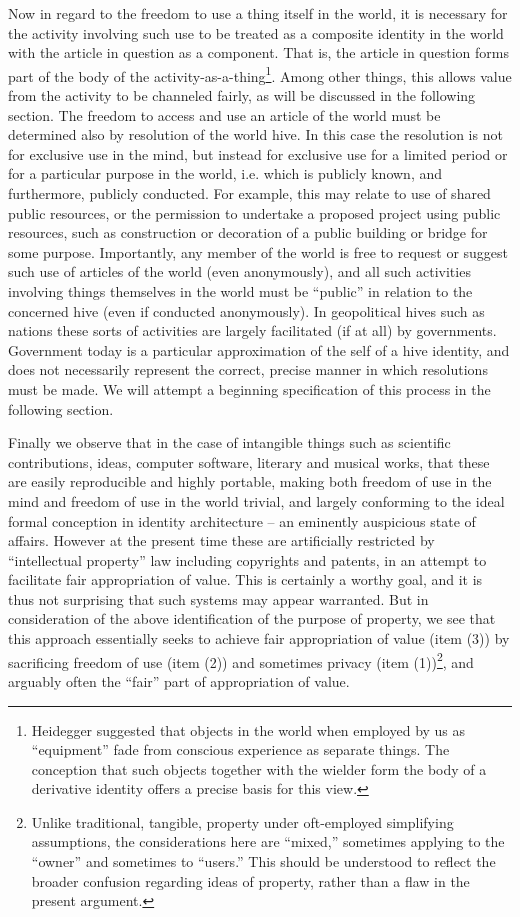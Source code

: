 \documentclass[pra,twocolumn,groupedaddress,10pt]{revtex4}
\theoremstyle{definition}
\begin{document}
Now in regard to the freedom to use a thing itself in the world, it is necessary for the activity involving such use to be treated as a composite identity in the world with the article in question as a component. That is, the article in question forms part of the body of the activity-as-a-thing\footnote{Heidegger\cite{heidegger} suggested that objects in the world when employed by us as ``equipment'' fade from conscious experience as separate things. The conception that such objects together with the wielder form the body of a derivative identity offers a precise basis for this view.}. Among other things, this allows value from the activity to be channeled fairly, as will be discussed in the following section. The freedom to access and use an article of the world must be determined also by resolution of the world hive. In this case the resolution is not for exclusive use in the mind, but instead for exclusive use for a limited period or for a particular purpose in the world, i.e. which is publicly known, and furthermore, publicly conducted. For example, this may relate to use of shared public resources, or the permission to undertake a proposed project using public resources, such as construction or decoration of a public building or bridge for some purpose. Importantly, any member of the world is free to request or suggest such use of articles of the world (even anonymously), and all such activities involving things themselves in the world must be ``public'' in relation to the concerned hive (even if conducted anonymously). In geopolitical hives such as nations these sorts of activities are largely facilitated (if at all) by governments. Government today is a particular approximation of the self of a hive identity, and does not necessarily represent the correct, precise manner in which resolutions must be made. We will attempt a beginning specification of this process in the following section.

Finally we observe that in the case of intangible things such as scientific contributions, ideas, computer software, literary and musical works, that these are easily reproducible and highly portable, making both freedom of use in the mind and freedom of use in the world trivial, and largely conforming to the ideal formal conception in identity architecture -- an eminently auspicious state of affairs. However at the present time these are artificially restricted by ``intellectual property'' law including copyrights and patents, in an attempt to facilitate fair appropriation of value. This is certainly a worthy goal, and it is thus not surprising that such systems may appear warranted. But in consideration of the above identification of the purpose of property, we see that this approach essentially seeks to achieve fair appropriation of value (item (3)) by sacrificing freedom of use (item (2)) and sometimes privacy (item (1))\footnote{Unlike traditional, tangible, property under oft-employed simplifying assumptions, the considerations here are ``mixed,'' sometimes applying to the ``owner'' and sometimes to ``users.'' This should be understood to reflect the broader confusion regarding ideas of property, rather than a flaw in the present argument.}, and arguably often the ``fair'' part of appropriation of value.
\end{document}
